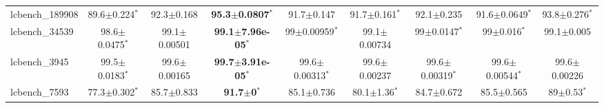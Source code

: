 \begin{table}[t]
\begin{center}
\begin{tabular}{lcccccccc}
lcbench\_189908 & 89.6$\pm$0.224$^{*}$ & 92.3$\pm$0.168 & \textbf{95.3$\pm$0.0807}$^{*}$ & 91.7$\pm$0.147 & 91.7$\pm$0.161$^{*}$ & 92.1$\pm$0.235 & 91.6$\pm$0.0649$^{*}$ & 93.8$\pm$0.276$^{*}$ \\
lcbench\_34539 & 98.6$\pm$0.0475$^{*}$ & 99.1$\pm$0.00501 & \textbf{99.1$\pm$7.96e-05}$^{*}$ & 99$\pm$0.00959$^{*}$ & 99.1$\pm$0.00734 & 99$\pm$0.0147$^{*}$ & 99$\pm$0.016$^{*}$ & 99.1$\pm$0.005 \\
lcbench\_3945 & 99.5$\pm$0.0183$^{*}$ & 99.6$\pm$0.00165 & \textbf{99.7$\pm$3.91e-05}$^{*}$ & 99.6$\pm$0.00313$^{*}$ & 99.6$\pm$0.00237 & 99.6$\pm$0.00319$^{*}$ & 99.6$\pm$0.00544$^{*}$ & 99.6$\pm$0.00226 \\
lcbench\_7593 & 77.3$\pm$0.302$^{*}$ & 85.7$\pm$0.833 & \textbf{91.7$\pm$0}$^{*}$ & 85.1$\pm$0.736 & 80.1$\pm$1.36$^{*}$ & 84.7$\pm$0.672 & 85.5$\pm$0.565 & 89$\pm$0.53$^{*}$ \\
\hline
\end{tabular}
\end{center}
\end{table}